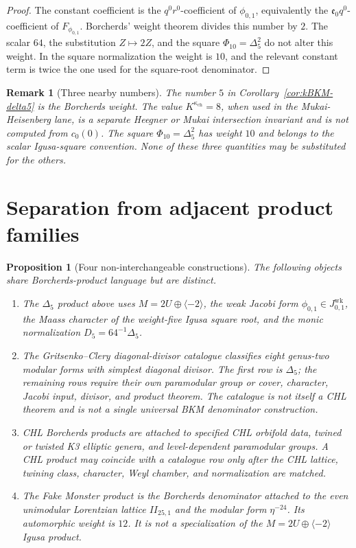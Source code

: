\documentclass[11pt]{amsart}
\newtheorem{proposition}[theorem]{Proposition}
\newtheorem{remark}[theorem]{Remark}
\newcommand{\kch}{\kappa_{\mathrm{ch}}}
\newcommand{\phij}{\phi_{0,1}}
\newcommand{\Delfive}{\Delta_5}
\newcommand{\PhiTen}{\Phi_{10}}
\begin{document}
\begin{proof}
The constant coefficient is the \(q^0r^0\)-coefficient of \(\phij\),
equivalently the \(\mathfrak e_0q^0\)-coefficient of \(F_{\phij}\).
Borcherds' weight theorem divides this number by \(2\).  The scalar
\(64\), the substitution \(Z\mapsto 2Z\), and the square
\(\PhiTen=\Delfive^2\) do not alter this weight.  In the square
normalization the weight is \(10\), and the relevant constant term is
twice the one used for the square-root denominator.
\end{proof}

\begin{remark}[Three nearby numbers]
\label{rem:three-nearby-numbers}
The number \(5\) in Corollary~\ref{cor:kBKM-delta5} is the Borcherds
weight.  The value \(K^{\kch}=8\), when used in the Mukai-Heisenberg
lane, is a separate Heegner or Mukai intersection invariant and is not
computed from \(c_0(0)\).  The square \(\PhiTen=\Delfive^2\) has weight
\(10\) and belongs to the scalar Igusa-square convention.  None of
these three quantities may be substituted for the others.
\end{remark}

\section{Separation from adjacent product families}

\begin{proposition}[Four non-interchangeable constructions]
\label{prop:separations}
The following objects share Borcherds-product language but are distinct.
\begin{enumerate}
\item The \(\Delfive\) product above uses \(M=2U\oplus\langle -2\rangle\),
the weak Jacobi form \(\phij\in J^{\mathrm{wk}}_{0,1}\), the Maass
character of the weight-five Igusa square root, and the monic
normalization \(D_5=64^{-1}\Delfive\).
\item The Gritsenko--Clery diagonal-divisor catalogue classifies eight
genus-two modular forms with simplest diagonal divisor.  The first row
is \(\Delfive\); the remaining rows require their own paramodular
group or cover, character, Jacobi input, divisor, and product theorem.
The catalogue is not itself a CHL theorem and is not a single universal
BKM denominator construction.
\item CHL Borcherds products are attached to specified CHL orbifold
data, twined or twisted K3 elliptic genera, and level-dependent
paramodular groups.  A CHL product may coincide with a catalogue row
only after the CHL lattice, twining class, character, Weyl chamber, and
normalization are matched.
\item The Fake Monster product is the Borcherds denominator attached
to the even unimodular Lorentzian lattice \(II_{25,1}\) and the modular
form \(\eta^{-24}\).  Its automorphic weight is \(12\).  It is not a
specialization of the \(M=2U\oplus\langle -2\rangle\) Igusa product.
\end{enumerate}
\end{proposition}
\end{document}
